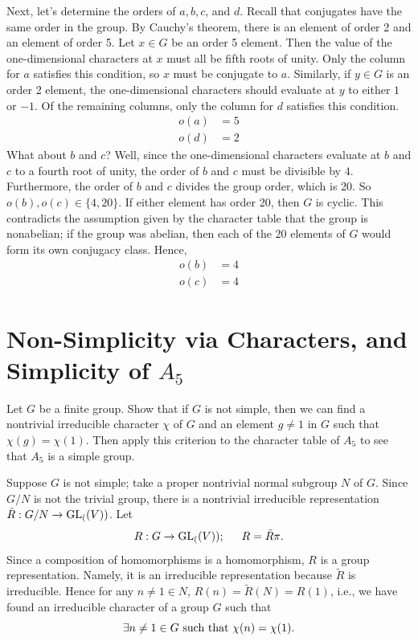 \documentclass[12pt]{article}
\begin{document}
Next, let's determine the orders of $a, b, c$, and $d$. 
Recall that conjugates have the same order in the group. 
By Cauchy's theorem, there is an element of order 2 and an element of order 5. 
Let $x \in G$ be an order 5 element. 
Then the value of the one-dimensional characters at $x$ must all be fifth roots of unity. 
Only the column for $a$ satisfies this condition, so $x$ must be conjugate to $a$. 
Similarly, if $y \in G$ is an order 2 element, the one-dimensional characters should evaluate at $y$ to either $1$ or $-1$.
Of the remaining columns, only the column for $d$ satisfies this condition. 
\begin{align*}
  o(a) & = 5 \\ 
  o(d) & = 2
\end{align*}
What about $b$ and $c$? 
Well, since the one-dimensional characters evaluate at $b$ and $c$ to a fourth root of unity, the order of $b$ and $c$ must be divisible by $4$. 
Furthermore, the order of $b$ and $c$ divides the group order, which is 20. 
So $o(b), o(c) \in \{4, 20\}$. 
If either element has order 20, then $G$ is cyclic. 
This contradicts the assumption given by the character table that the group is nonabelian; 
if the group was abelian, then each of the 20 elements of $G$ would form its own conjugacy class. 
Hence, 
\begin{align*}
  o(b) & = 4 \\ 
  o(c) & = 4
\end{align*}


\section{Non-Simplicity via Characters, and Simplicity of $A_5$}

Let $G$ be a finite group.  Show that if $G$ is not simple, then we can find a
nontrivial irreducible character $\chi$ of $G$ and an element $g \neq 1$ in
$G$ such that $\chi(g) = \chi(1)$.  Then apply this criterion to the character
table of $A_5$ to see that $A_5$ is a simple group.

\noindent\dotfill

Suppose $G$ is not simple; 
take a proper nontrivial normal subgroup $N$ of $G$. 
Since $G / N$ is not the trivial group, there is a nontrivial irreducible representation $\tilde{R}: G / N \rightarrow \text{GL}_{(}(V))$. 
Let 
$$R: G \rightarrow \text{GL}_{(}(V)); \hspace{1.5em} R = \tilde{R} \pi.$$ 
Since a composition of homomorphisms is a homomorphism, $R$ is a group representation. 
Namely, it is an irreducible representation because $\tilde{R}$ is irreducible. 
Hence for any $n \neq 1 \in N$, $R(n) = \tilde{R}(N) = R(1)$,
i.e., 
we have found an irreducible character of a group $G$ such that 
$$\exists n \neq 1 \in G \text{ such that } \chi(n) = \chi(1).$$
\end{document}
